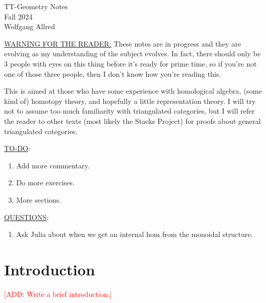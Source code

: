 \documentclass[11pt]{article}
\begin{document}
\begin{centering}
\Large{TT-Geometry Notes}\\

\normalsize{Fall 2024 \\ Wolfgang Allred}

\end{centering}
\bigskip

\noindent

\large{\underline{WARNING FOR THE READER:}} \normalsize These notes are in progress and they are evolving as my understanding of the subject evolves. In fact, there should only be 3 people with eyes on this thing before it's ready for prime time, so if you're not one of those three people, then I don't know how you're reading this.

This is aimed at those who have some experience with homological algebra, (some kind of) homotopy theory, and hopefully a little representation theory. I will try not to assume too much familiarity with triangulated categories, but I will refer the reader to other texts (most likely the Stacks Project) for proofs about general triangulated categories.

\large{\underline{TO-DO}:}\normalsize
\begin{enumerate}[$\bullet$]
	\item Add more commentary.
	\item Do more exercises.
	\item More sections.
\end{enumerate}


\large{\underline{QUESTIONS}:}\normalsize
\begin{enumerate}[$\bullet$]
	\item Ask Julia about when we get an internal hom from the monoidal structure.
\end{enumerate}

\newpage
\section{Introduction}

\large{\textcolor{red}{[ADD: Write a brief introduction.]}} \normalsize
\end{document}
